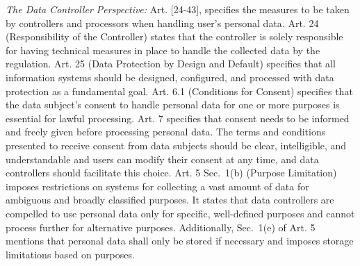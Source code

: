 \emph{The Data Controller Perspective:} 
Art. [24-43], specifies the measures to be taken by controllers and processors when handling user's personal data. Art. 24 (Responsibility of the Controller) states that the controller is solely responsible for having technical measures in place to handle the collected data by the regulation. Art. 25 (Data Protection by Design and Default) specifies that all information systems should be designed, configured, and processed with data protection as a fundamental goal. 
Art. 6.1 (Conditions for Consent)  specifies that the data subject's consent to handle personal data for one or more purposes is essential for lawful processing. Art. 7 specifies %
that consent needs to be informed and freely given before processing personal data. The terms and conditions presented to receive consent from data subjects should be clear, intelligible, and understandable and users can modify their %
consent at any time, and data controllers should facilitate this choice.
 Art. 5 Sec.~1(b) (Purpose Limitation) imposes restrictions on systems for collecting a vast amount of data for ambiguous and broadly classified purposes. It states that data controllers are compelled to use personal data only for specific, well-defined purposes and cannot process further for alternative purposes. Additionally, Sec.~1(e) of Art. 5 mentions that personal data shall only be stored if necessary and imposes storage limitations based on purposes.


